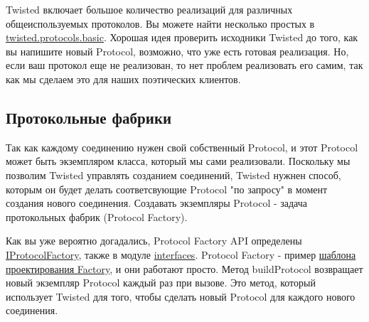 
Twisted включает большое количество 
реализаций для различных общеиспользуемых протоколов. 
Вы можете найти несколько простых в 
\href{http://twistedmatrix.com/trac/browser/tags/releases/twisted-8.2.0/twisted/protocols/basic.py}{twisted.protocols.basic}. 
Хорошая идея проверить исходники Twisted до того, как 
вы напишите новый Protocol, возможно, что уже есть 
готовая реализация. Но, если ваш протокол еще не реализован, 
то нет проблем реализовать его самим, так как мы сделаем 
это для наших поэтических клиентов.


\subsection{Протокольные фабрики}


Так как каждому соединению нужен свой собственный Protocol, 
и этот Protocol может быть экземпляром класса, который мы 
сами реализовали. Поскольку мы позволим Twisted управлять 
созданием соединений, Twisted нужнен способ, которым он 
будет делать соответсвующие Protocol "по запросу" в момент 
создания нового соединения. Создавать экземпляры Protocol - 
задача протокольных фабрик (Protocol Factory). 


Как вы уже вероятно догадались, Protocol Factory API определены 
\href{http://twistedmatrix.com/trac/browser/tags/releases/twisted-8.2.0/twisted/internet/interfaces.py#L1259}{IProtocolFactory}, также в модуле  
\href{http://twistedmatrix.com/trac/browser/tags/releases/twisted-8.2.0/twisted/internet/interfaces.py}{interfaces}. 
Protocol Factory - пример \href{http://en.wikipedia.org/wiki/Factory\_pattern}{шаблона проектирования Factory}, и 
они работают просто. Метод buildProtocol возвращает новый экземпляр 
Protocol каждый раз при вызове. Это метод, который 
использует Twisted для того, чтобы сделать новый Protocol 
для каждого нового соединения.


